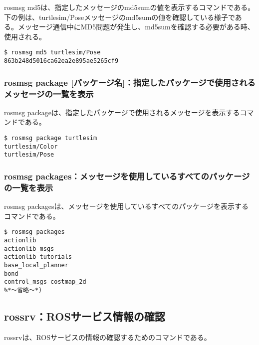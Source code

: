 rosmsg md5は、指定したメッセージのmd5sumの値を表示するコマンドである。下の例は、turtlesim/Poseメッセージのmd5sumの値を確認している様子である。メッセージ通信中にMD5問題が発生し、md5sumを確認する必要がある時、使用される。

\begin{lstlisting}[language=ROS]
$ rosmsg md5 turtlesim/Pose
863b248d5016ca62ea2e895ae5265cf9
\end{lstlisting}

\subsubsection{rosmsg package [パッケージ名]：指定したパッケージで使用されるメッセージの一覧を表示}

rosmsg packageは、指定したパッケージで使用されるメッセージを表示するコマンドである。

\begin{lstlisting}[language=ROS]
$ rosmsg package turtlesim
turtlesim/Color
turtlesim/Pose
\end{lstlisting}

\subsubsection{rosmsg packages：メッセージを使用しているすべてのパッケージの一覧を表示}

rosmsg packagesは、メッセージを使用しているすべてのパッケージを表示するコマンドである。

\begin{lstlisting}[language=ROS]
$ rosmsg packages
actionlib
actionlib_msgs
actionlib_tutorials
base_local_planner
bond
control_msgs costmap_2d
%*〜省略〜*)
\end{lstlisting}

\subsection{rossrv：ROSサービス情報の確認}

\vspace{\baselineskip}
rossrvは、ROSサービスの情報の確認するためのコマンドである。
\vspace{\baselineskip}

